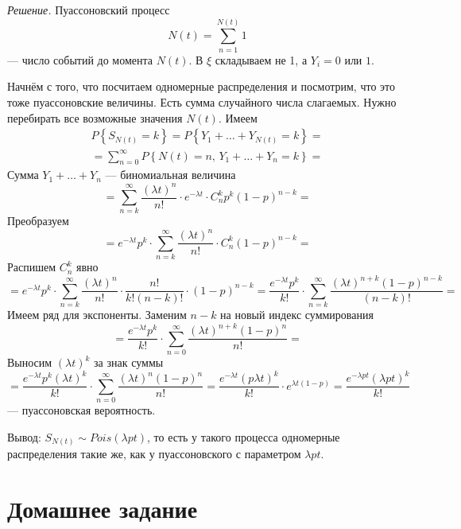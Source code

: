 \textit{Решение.}
Пуассоновский процесс
$$N \left( t \right) =
  \sum \limits_{n = 1}^{N \left( t \right) } 1$$
--- число событий до момента $N \left( t \right) $.
В $ \xi $ складываем не 1, а $Y_i = 0$ или $1$.

Начнём с того, что посчитаем одномерные распределения и посмотрим,
что это тоже пуассоновские величины.
Есть сумма случайного числа слагаемых.
Нужно перебирать все возможные значения $N \left( t \right) $.
Имеем
\begin{gather*}
  P \left\{ S_{N \left( t \right) } = k \right\} =
  P \left\{ Y_1 + \dotsc + Y_{N \left( t \right) } = k \right\} = \\
  = \sum \limits_{n = 0}^{ \infty }
    P \left\{ N \left( t \right) = n, \, Y_1 + \dotsc + Y_n = k \right\} =
\end{gather*}
Сумма $Y_1 + \dotsc + Y_n $ --- биномиальная величина
$$= \sum \limits_{n = k}^{ \infty }
    \frac{ \left( \lambda t \right)^n}{n!} \cdot
    e^{-\lambda t} \cdot C_n^k p^k \left( 1 - p \right)^{n - k} =$$
Преобразуем
$$= e^{-\lambda t} p^k \cdot
  \sum \limits_{n = k}^{ \infty }
    \frac{ \left( \lambda t \right)^n}{n!} \cdot C_n^k \left( 1 - p \right)^{n - k} =$$
Распишем $C_n^k$ явно
$$= e^{-\lambda t} p^k \cdot
  \sum \limits_{n = k}^{ \infty }
    \frac{ \left( \lambda t \right)^n}{n!} \cdot
    \frac{n!}{k! \left( n - k \right)!} \cdot \left( 1 - p \right)^{n - k} =
  \frac{e^{-\lambda t} p^k}{k!} \cdot
  \sum \limits_{n = k}^{ \infty }
    \frac{ \left( \lambda t \right)^{n + k} \left( 1 - p \right)^{n - k}}{ \left( n - k \right)!} =$$
Имеем ряд для экспоненты.
Заменим $n - k$ на новый индекс суммирования
$$= \frac{e^{-\lambda t} p^k}{k!} \cdot
  \sum \limits_{n = 0}^{ \infty }
    \frac{ \left( \lambda t \right)^{n + k} \left( 1-  p \right)^n}{n!} =$$
Выносим $ \left( \lambda t \right)^k$ за знак суммы
$$= \frac{e^{-\lambda t} p^k \left( \lambda t \right)^k}{k!} \cdot
  \sum \limits_{n = 0}^{ \infty } \frac{ \left( \lambda t \right)^n \left( 1 - p \right)^n}{n!} =
  \frac{e^{-\lambda t} \left(p \lambda t \right)^k}{k!} \cdot e^{ \lambda t \left( 1 - p \right) } =
  \frac{e^{-\lambda pt} \left( \lambda pt \right)^k}{k!}$$
--- пуассоновская вероятность.

Вывод: $S_{N \left( t \right) } \sim Pois \left( \lambda pt \right) $,
то есть у такого процесса одномерные распределения такие же,
как у пуассоновского с параметром $ \lambda pt$.

\section*{Домашнее задание}

